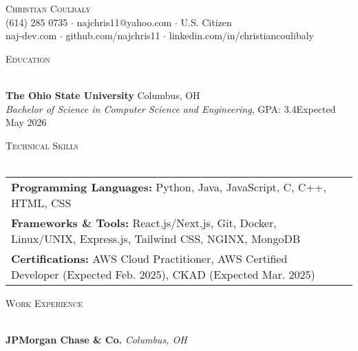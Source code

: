 \documentclass[letterpaper]{article}
\newcommand{\lineunder} {
    \vspace*{-8pt} \\
    \hspace*{-18pt} \hrulefill \\
}
\newcommand{\header} [1] {
    {\hspace*{-18pt}\vspace*{6pt} \textsc{#1}}
    \vspace*{-6pt} \lineunder
}
\begin{document}
\vspace*{-40pt}

\vspace*{-10pt}
\begin{center}
	{\Huge \scshape {Christian Coulbaly}}\\
	(614) 285 0735 $\cdot$ najchris11@yahoo.com $\cdot$ U.S. Citizen \\
    naj-dev.com $\cdot$ github.com/najchris11 $\cdot$ linkedin.com/in/christiancoulibaly\\
\end{center}

\header{Education}
\vspace{1mm}

    \textbf{The Ohio State University} \hfill Columbus, OH\\
    \textit{Bachelor of Science in Computer Science and Engineering}, GPA: 3.4\hfill \hfill Expected May 2026\\
    \vspace{2mm}


\header{Technical Skills}
\vspace{1.5mm}
\hspace{-3mm}
\begin{tabular}{ l l }

    \textbf{Programming Languages:} Python, Java, JavaScript, C, C++, HTML, CSS \\

    \textbf{Frameworks \& Tools:} React.js/Next.js, Git, Docker, Linux/UNIX, Express.js, Tailwind CSS, NGINX, MongoDB  \\

    \textbf{Certifications:} AWS Cloud Practitioner, AWS Certified Developer (Expected Feb. 2025), CKAD (Expected Mar. 2025)  \\

\end{tabular}
\vspace{2mm}

\header{Work Experience}
\vspace{1mm}

    \textbf{JPMorgan Chase \& Co.} \hfill \textsl{Columbus, OH}\\
    
\end{document}
